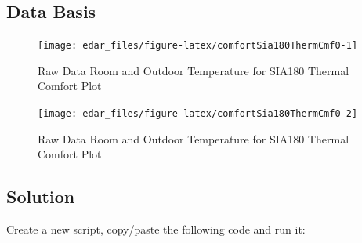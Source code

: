 \documentclass[
  a4paperpaper,
]{book}
\begin{document}
\hypertarget{data-basis-13}{%
\subsection{Data Basis}\label{data-basis-13}}

\begin{figure}
\texttt{[image: edar\_files/figure-latex/comfortSia180ThermCmf0-1]} \caption{Raw Data Room and Outdoor Temperature for SIA180 Thermal Comfort Plot}\label{fig:comfortSia180ThermCmf0-1}
\end{figure}
\begin{figure}
\texttt{[image: edar\_files/figure-latex/comfortSia180ThermCmf0-2]} \caption{Raw Data Room and Outdoor Temperature for SIA180 Thermal Comfort Plot}\label{fig:comfortSia180ThermCmf0-2}
\end{figure}

\newpage

\hypertarget{solution-13}{%
\subsection{Solution}\label{solution-13}}

Create a new script, copy/paste the following code and run it:
\end{document}
